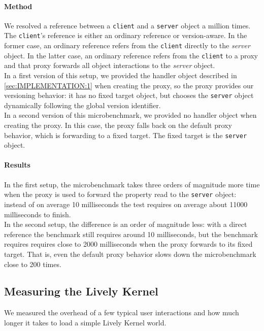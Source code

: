 \paragraph{Method}
We resolved a reference between a \lstinline{client} and a \lstinline{server} object a million times.
The \lstinline{client}'s reference is either an ordinary reference or version-aware.
In the former case, an ordinary reference refers from the \lstinline{client} directly to the \emph{server} object.
In the latter case, an ordinary reference refers from the \lstinline{client} to a proxy and that proxy forwards all object interactions to the \emph{server} object.\\
In a first version of this setup, we provided the handler object described in \ref{sec:IMPLEMENTATION:1} when creating the proxy, so the proxy provides our versioning behavior: it has no fixed target object, but chooses the \lstinline{server} object dynamically following the global version identifier.\\
In a second version of this microbenchmark, we provided no handler object when creating the proxy.
In this case, the proxy falls back on the default proxy behavior, which is forwarding to a fixed target.
The fixed target is the \lstinline{server} object.


\paragraph{Results}
In the first setup, the microbenchmark takes three orders of magnitude more time when the proxy is used to forward the property read to the \lstinline{server} object: instead of on average 10 milliseconds the test requires on average about 11000 milliseconds to finish.\\
In the second setup, the difference is an order of magnitude less: with a direct reference the benchmark still requires around 10 milliseconds, but the benchmark requires requires close to 2000 milliseconds when the proxy forwards to its fixed target.
That is, even the default proxy behavior slows down the microbenchmark close to 200 times.



\subsection{Measuring the Lively Kernel}

We measured the overhead of a few typical user interactions and how much longer it takes to load a simple Lively Kernel world.

